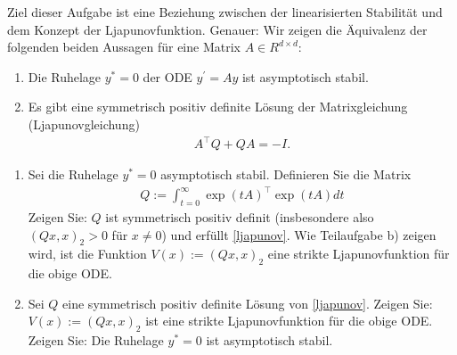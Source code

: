 \begin{exercise}
Ziel dieser Aufgabe ist eine Beziehung zwischen der linearisierten Stabilität und
dem Konzept der Ljapunovfunktion. Genauer: Wir zeigen die Äquivalenz der folgenden
beiden Aussagen für eine Matrix $A \in R^{d \times d}$:
\begin{enumerate}
  \item Die Ruhelage $y^* = 0$ der ODE $y^{\prime} = Ay$ ist asymptotisch stabil.
  \item Es gibt eine symmetrisch positiv definite Lösung der Matrixgleichung
  (\glqq Ljapunovgleichung\grqq)
  \begin{align} \label{ljapunov}
    A^{\top}Q + QA = -I.
  \end{align}
\end{enumerate}
\begin{enumerate}[label = \textbf{\alph*)}]
  \item Sei die Ruhelage $y^* = 0$ asymptotisch stabil. Definieren Sie die Matrix
  \begin{align*}
    Q := \int_{t = 0}^{\infty} \exp(tA)^{\top}\exp(tA) dt
  \end{align*}
  Zeigen Sie: $Q$ ist symmetrisch positiv definit (insbesondere also $(Qx,x)_2 > 0$
  für $x \neq 0$) und erfüllt \eqref{ljapunov}. Wie Teilaufgabe b) zeigen wird,
  ist die Funktion $V(x) := (Qx,x)_2$ eine strikte Ljapunovfunktion für die obige ODE.
  \item Sei $Q$ eine symmetrisch positiv definite Lösung von \eqref{ljapunov}.
  Zeigen Sie: $V(x) := (Qx,x)_2$ ist eine strikte Ljapunovfunktion für die obige ODE.
  Zeigen Sie: Die Ruhelage $y^* = 0$ ist asymptotisch stabil.
\end{enumerate}
\end{exercise}
